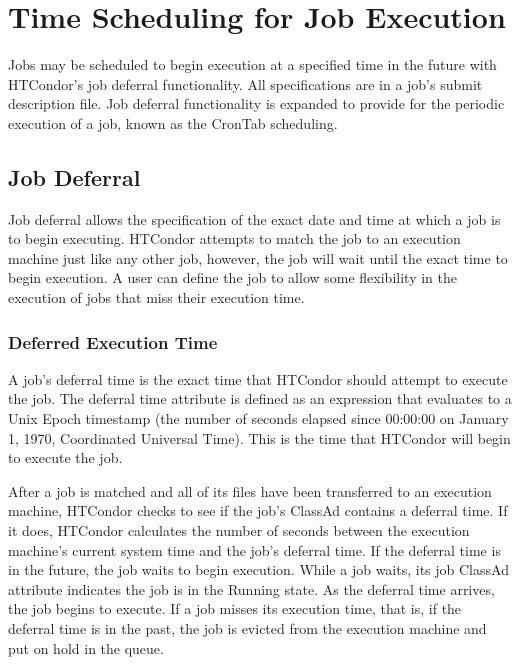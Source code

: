\section{Time Scheduling for Job Execution}
\label{sec:Job-Executetime-Scheduling}

Jobs may be scheduled to begin execution at a specified time in the future
with HTCondor's job deferral functionality.
All specifications are in a job's submit description file.
Job deferral functionality is expanded to provide for the
periodic execution of a job, known as the CronTab scheduling.

\subsection{Job Deferral}
\label{sec:JobDeferral}

Job deferral allows the specification of
the exact date and time at which a job is to begin executing.
HTCondor attempts to match the job to an execution machine
just like any other job,
however, the job will wait until the exact time to begin execution.
A user can define the job to allow some flexibility in the execution of jobs
that miss their execution time.

\subsubsection{Deferred Execution Time}
\label{sec:JobDeferral-DeferralTime}

A job's deferral time is the exact time that HTCondor should attempt
to execute the job.
The deferral time attribute is defined as an expression
that evaluates to a Unix Epoch timestamp
(the number of seconds elapsed since 00:00:00 on January 1, 1970,
Coordinated Universal Time).
This is the time that HTCondor will begin to execute the job.

After a job is matched and all of its files have been transferred
to an execution machine,
HTCondor checks to see if the job's ClassAd contains a deferral time.
If it does,
HTCondor calculates the number of seconds between the execution
machine's current system time and the job's deferral time.
If the deferral time is in the future,
the job waits to begin execution.
While a job waits,
its job ClassAd attribute  indicates the job
is in the Running state.
As the deferral time arrives, the job begins to execute.
If a job misses its execution time,
that is, if the deferral time is in the past,
the job is evicted from the execution machine and put on hold in the queue.

